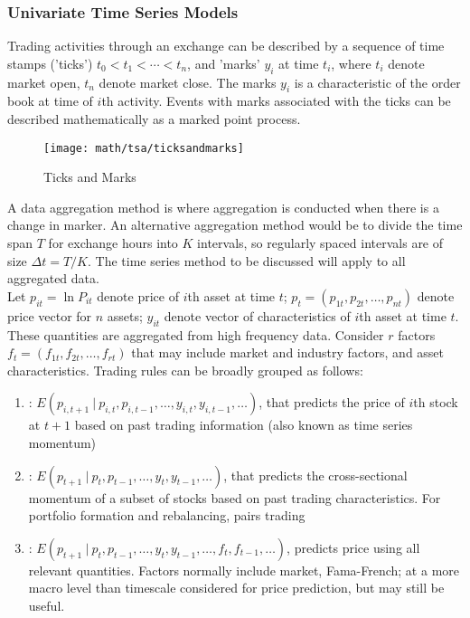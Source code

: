 \subsubsection{Univariate Time Series Models}

Trading activities through an exchange can be described by a sequence of time stamps ('ticks') $t_0 < t_1 < \cdots < t_n$, and 'marks' $y_i$ at time $t_i$, where $t_i$ denote market open, $t_n$ denote market close. The marks $y_i$ is a characteristic of the order book at time of $i$th activity. Events with marks associated with the ticks can be described mathematically as a marked point process.
\begin{figure}[H]
\centering
\texttt{[image: math/tsa/ticksandmarks]}
\caption{Ticks and Marks}
\end{figure}

A data aggregation method is where aggregation is conducted when there is a change in marker. An alternative aggregation method would be to divide the time span $T$ for exchange hours into $K$ intervals, so regularly spaced intervals are of size $\Delta t = T/K$. The time series method to be discussed will apply to all aggregated data.\\

Let $p_{it} = \ln P_{it}$ denote price of $i$th asset at time $t$; $p_t = (p_{1t}, p_{2t}, \ldots, p_{nt})$ denote price vector for $n$ assets; $y_{it}$ denote vector of characteristics of $i$th asset at time $t$. These quantities are aggregated from high frequency data. Consider $r$ factors $f_t = (f_{1t}, f_{2t}, \ldots, f_{rt})$ that may include market and industry factors, and asset characteristics. Trading rules can be broadly grouped as follows:
\begin{enumerate}[label=\roman*.]
\setlength{\itemsep}{0pt}
\item {}: $E(p_{i, t+1} \ \vert \ p_{i,t}, p_{i, t-1}, \ldots, y_{i,t}, y_{i, t-1}, \ldots)$, that predicts the price of $i$th stock at $t+1$ based on past trading information (also known as time series momentum)
\item {}: $E(p_{t+1} \ \vert \ p_t, p_{t-1}, \ldots, y_t, y_{t-1}, \ldots)$, that predicts the cross-sectional momentum of a subset of stocks based on past trading characteristics. For portfolio formation and rebalancing, pairs trading
\item {}: $E(p_{t+1} \ \vert \ p_{t}, p_{t-1}, \ldots, y_t, y_{t-1}, \ldots, f_t, f_{t-1}, \ldots)$, predicts price using all relevant quantities. Factors normally include market, Fama-French; at a more macro level than timescale considered for price prediction, but may still be useful.
\end{enumerate}

